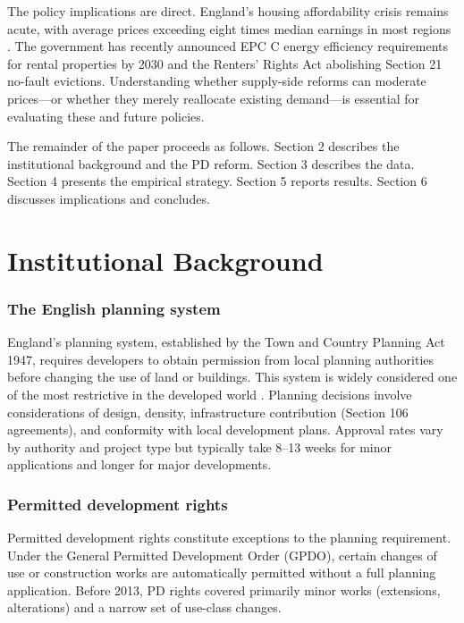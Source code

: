 \documentclass[12pt]{article}
\begin{document}
The policy implications are direct. England's housing affordability crisis remains acute, with average prices exceeding eight times median earnings in most regions \citep{ons2024}. The government has recently announced EPC C energy efficiency requirements for rental properties by 2030 and the Renters' Rights Act abolishing Section 21 no-fault evictions. Understanding whether supply-side reforms can moderate prices---or whether they merely reallocate existing demand---is essential for evaluating these and future policies.

The remainder of the paper proceeds as follows. Section 2 describes the institutional background and the PD reform. Section 3 describes the data. Section 4 presents the empirical strategy. Section 5 reports results. Section 6 discusses implications and concludes.


\section{Institutional Background}

\subsubsection*{The English planning system} England's planning system, established by the Town and Country Planning Act 1947, requires developers to obtain permission from local planning authorities before changing the use of land or buildings. This system is widely considered one of the most restrictive in the developed world \citep{hilber2016, cheshire2018}. Planning decisions involve considerations of design, density, infrastructure contribution (Section 106 agreements), and conformity with local development plans. Approval rates vary by authority and project type but typically take 8--13 weeks for minor applications and longer for major developments.

\subsubsection*{Permitted development rights} Permitted development rights constitute exceptions to the planning requirement. Under the General Permitted Development Order (GPDO), certain changes of use or construction works are automatically permitted without a full planning application. Before 2013, PD rights covered primarily minor works (extensions, alterations) and a narrow set of use-class changes.
\end{document}
